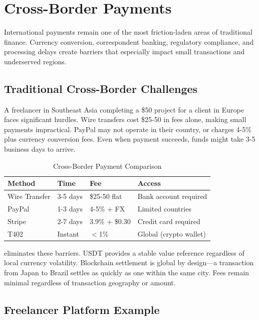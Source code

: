 \section{Cross-Border Payments}
\label{sec:cross-border}

International payments remain one of the most friction-laden areas of traditional finance. Currency conversion, correspondent banking, regulatory compliance, and processing delays create barriers that especially impact small transactions and underserved regions.

\subsection{Traditional Cross-Border Challenges}

A freelancer in Southeast Asia completing a \$50 project for a client in Europe faces significant hurdles. Wire transfers cost \$25-50 in fees alone, making small payments impractical. PayPal may not operate in their country, or charges 4-5\% plus currency conversion fees. Even when payment succeeds, funds might take 3-5 business days to arrive.

\begin{table}[htbp]
\centering
\caption{Cross-Border Payment Comparison}
\label{tab:cross-border}
\footnotesize
\begin{tabular}{l l l l}
\toprule
\textbf{Method} & \textbf{Time} & \textbf{Fee} & \textbf{Access} \\
\midrule
Wire Transfer & 3-5 days & \$25-50 flat & Bank account required \\
PayPal & 1-3 days & 4-5\% + FX & Limited countries \\
Stripe & 2-7 days & 3.9\% + \$0.30 & Credit card required \\
T402 & Instant & $<$1\% & Global (crypto wallet) \\
\bottomrule
\end{tabular}
\end{table}

\tprotocol{} eliminates these barriers. USDT provides a stable value reference regardless of local currency volatility. Blockchain settlement is global by design---a transaction from Japan to Brazil settles as quickly as one within the same city. Fees remain minimal regardless of transaction geography or amount.

\subsection{Freelancer Platform Example}

